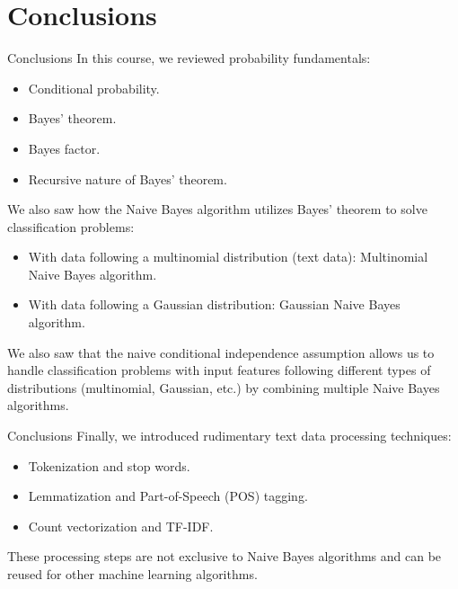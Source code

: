 \section{Conclusions}

\begin{frame}{Conclusions}
	In this course, we reviewed probability fundamentals:
	\begin{itemize}
		\item Conditional probability.
		\item Bayes' theorem.
		\item Bayes factor.
		\item Recursive nature of Bayes' theorem.
	\end{itemize}
	\pause
	We also saw how the Naive Bayes algorithm utilizes Bayes' theorem to solve classification problems:
	\begin{itemize}
		\item With data following a multinomial distribution (text data): Multinomial Naive Bayes algorithm.
		\item With data following a Gaussian distribution: Gaussian Naive Bayes algorithm.
	\end{itemize}
	\pause
	We also saw that the naive conditional independence assumption allows us to handle classification problems with input features following different types of distributions (multinomial, Gaussian, etc.) by combining multiple Naive Bayes algorithms.
\end{frame}

\begin{frame}{Conclusions}
	Finally, we introduced rudimentary text data processing techniques:
	\begin{itemize}
		\item Tokenization and stop words.
		\item Lemmatization and Part-of-Speech (POS) tagging.
		\item Count vectorization and TF-IDF.
	\end{itemize}
	\pause
	These processing steps are not exclusive to Naive Bayes algorithms and can be reused for other machine learning algorithms.
\end{frame}